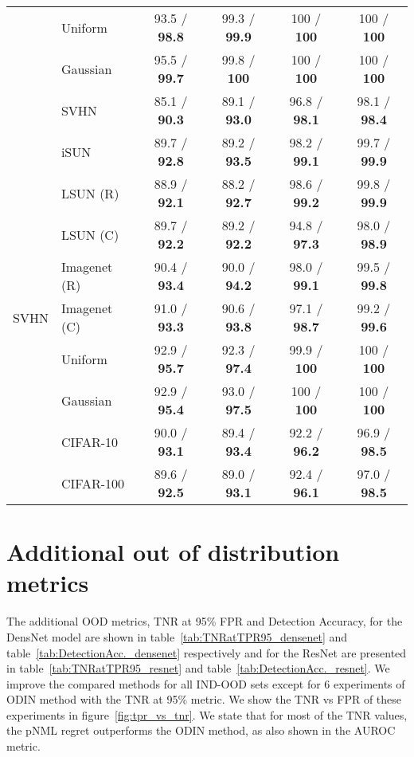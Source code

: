\documentclass{article}
\def\tableref#1{table~\ref{#1}}
\def\figref#1{figure~\ref{#1}}
\begin{document}
\begin{table}[tbh]
\begin{tabular}{clcccc}
     & Uniform &  93.5 / \textbf{98.8} &  99.3 / \textbf{99.9} &    100 / \textbf{100} &    100 / \textbf{100} \\
     & Gaussian &  95.5 / \textbf{99.7} &   99.8 / \textbf{100} &    100 / \textbf{100} &    100 / \textbf{100} \\
     & SVHN &  85.1 / \textbf{90.3} &  89.1 / \textbf{93.0} &  96.8 / \textbf{98.1} &  98.1 / \textbf{98.4} \\
\midrule
\multirow{9}{*}{SVHN} & iSUN &  89.7 / \textbf{92.8} &  89.2 / \textbf{93.5} &  98.2 / \textbf{99.1} &  99.7 / \textbf{99.9} \\
     & LSUN (R) &  88.9 / \textbf{92.1} &  88.2 / \textbf{92.7} &  98.6 / \textbf{99.2} &  99.8 / \textbf{99.9} \\
     & LSUN (C) &  89.7 / \textbf{92.2} &  89.2 / \textbf{92.2} &  94.8 / \textbf{97.3} &  98.0 / \textbf{98.9} \\
     & Imagenet (R) &  90.4 / \textbf{93.4} &  90.0 / \textbf{94.2} &  98.0 / \textbf{99.1} &  99.5 / \textbf{99.8} \\
     & Imagenet (C) &  91.0 / \textbf{93.3} &  90.6 / \textbf{93.8} &  97.1 / \textbf{98.7} &  99.2 / \textbf{99.6} \\
     & Uniform &  92.9 / \textbf{95.7} &  92.3 / \textbf{97.4} &   99.9 / \textbf{100} &    100 / \textbf{100} \\
     & Gaussian &  92.9 / \textbf{95.4} &  93.0 / \textbf{97.5} &    100 / \textbf{100} &    100 / \textbf{100} \\
     & CIFAR-10 &  90.0 / \textbf{93.1} &  89.4 / \textbf{93.4} &  92.2 / \textbf{96.2} &  96.9 / \textbf{98.5} \\
     & CIFAR-100 &  89.6 / \textbf{92.5} &  89.0 / \textbf{93.1} &  92.4 / \textbf{96.1} &  97.0 / \textbf{98.5} \\
\bottomrule
\end{tabular}
 \end{table}


\section{Additional out of distribution metrics}
\label{appendix:ood_results}

The additional OOD metrics, TNR at 95\% FPR and Detection Accuracy, for the DensNet model are shown in \tableref{tab:TNRatTPR95_densenet} and \tableref{tab:DetectionAcc._densenet} respectively and for the ResNet are presented in \tableref{tab:TNRatTPR95_resnet} and \tableref{tab:DetectionAcc._resnet}.
We improve the compared methods for all IND-OOD sets except for 6 experiments of ODIN method with the TNR at 95\% metric.
We show the TNR vs FPR of these experiments in \figref{fig:tpr_vs_tnr}.
We state that for most of the TNR values, the pNML regret outperforms the ODIN method, as also shown in the AUROC metric.
\end{document}
